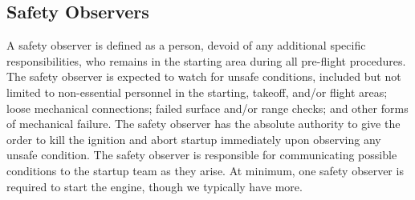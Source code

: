 \documentclass[pdftex,10pt,letter]{article}
\begin{document}
\subsection{Safety Observers}
A safety observer is defined as a person, devoid of any additional specific responsibilities, who remains in the starting area during all pre-flight procedures.  The safety observer is expected to watch for unsafe conditions, included but not limited to non-essential personnel in the starting, takeoff, and/or flight areas; loose mechanical connections; failed surface and/or range checks; and other forms of mechanical failure.  The safety observer has the absolute authority to give the order to kill the ignition and abort startup immediately upon observing any unsafe condition.  The safety observer is responsible for communicating possible conditions to the startup team as they arise. At minimum, one safety observer is required to start the engine, though we typically have more.

\newpage
\appendix
\renewcommand\thesection{Appendix \Alph{section}:}
\end{document}
